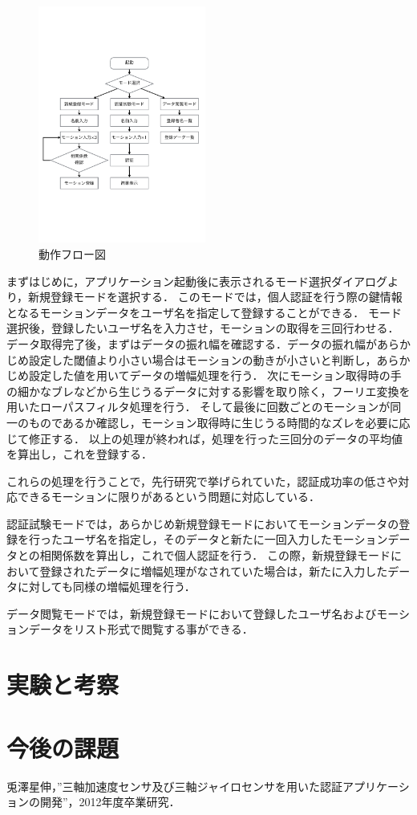 \documentclass[11pt]{jarticle}
\begin{document}
\begin{figure}
    \begin{center}
        \includegraphics[width=55mm, bb=0 183 594 670]{Flow.pdf}
        \caption{動作フロー図}
        \label{flow}
    \end{center}
\end{figure}

まずはじめに，アプリケーション起動後に表示されるモード選択ダイアログより，新規登録モードを選択する．
このモードでは，個人認証を行う際の鍵情報となるモーションデータをユーザ名を指定して登録することができる．
モード選択後，登録したいユーザ名を入力させ，モーションの取得を三回行わせる．
データ取得完了後，まずはデータの振れ幅を確認する．データの振れ幅があらかじめ設定した閾値より小さい場合はモーションの動きが小さいと判断し，あらかじめ設定した値を用いてデータの増幅処理を行う．
次にモーション取得時の手の細かなブレなどから生じうるデータに対する影響を取り除く，フーリエ変換を用いたローパスフィルタ処理を行う．
そして最後に回数ごとのモーションが同一のものであるか確認し，モーション取得時に生じうる時間的なズレを必要に応じて修正する．
以上の処理が終われば，処理を行った三回分のデータの平均値を算出し，これを登録する．

これらの処理を行うことで，先行研究で挙げられていた，認証成功率の低さや対応できるモーションに限りがあるという問題に対応している．

認証試験モードでは，あらかじめ新規登録モードにおいてモーションデータの登録を行ったユーザ名を指定し，そのデータと新たに一回入力したモーションデータとの相関係数を算出し，これで個人認証を行う．
この際，新規登録モードにおいて登録されたデータに増幅処理がなされていた場合は，新たに入力したデータに対しても同様の増幅処理を行う．

データ閲覧モードでは，新規登録モードにおいて登録したユーザ名およびモーションデータをリスト形式で閲覧する事ができる．

\section{実験と考察}

\section{今後の課題}

\begin{thebibliography}{9}
    兎澤星伸，”三軸加速度センサ及び三軸ジャイロセンサを用いた認証アプリケーションの開発”，2012年度卒業研究．
\end{thebibliography}
\end{document}
